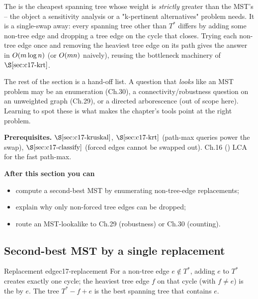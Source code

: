 \begin{topicintro}
The  is the cheapest spanning tree whose weight is
\emph{strictly} greater than the MST's -- the object a sensitivity analysis or a
"k-pertinent alternatives" problem needs.  It is a single-swap away: every
spanning tree other than \(T^{*}\) differs by adding some non-tree edge and
dropping a tree edge on the cycle that closes.  Trying each non-tree edge once and
removing the heaviest tree edge on its path gives the answer in
\(O(m\log n)\) (or \(O(mn)\) naively), reusing the bottleneck machinery of
\(\secref{c17-krt}\).

The rest of the section is a hand-off list.  A question that \emph{looks} like an
MST problem may be an enumeration (Ch.30), a connectivity/robustness question on
an unweighted graph (Ch.29), or a directed arborescence (out of scope here).
Learning to spot these is what makes the chapter's tools point at the right problem.

\textbf{Prerequisites.} \(\secref{c17-kruskal}\), \(\secref{c17-krt}\) (path-max
queries power the swap), \(\secref{c17-classify}\) (forced edges cannot be swapped
out).  Ch.16 () LCA for the fast path-max.

\textbf{After this section you can}
\begin{itemize}[nosep]
  \item compute a second-best MST by enumerating non-tree-edge replacements; \hfill{}
  \item explain why only non-forced tree edges can be dropped; \hfill{}
  \item route an MST-lookalike to Ch.29 (robustness) or Ch.30 (counting). \hfill{}
\end{itemize}
\end{topicintro}

\subsection{Second-best MST by a single replacement}

\begin{definition}{Replacement edge}{c17-replacement}
For a non-tree edge \(e\notin T^{*}\), adding \(e\) to \(T^{*}\) creates exactly one
cycle; the heaviest tree edge \(f\) on that cycle (with \(f\ne e\)) is the
 by \(e\).  The tree \(T^{*}-f+e\) is the best spanning tree
that contains \(e\).
\end{definition}

